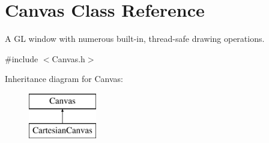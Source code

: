 \hypertarget{class_canvas}{\section{Canvas Class Reference}
\label{class_canvas}
}


A G\+L window with numerous built-\/in, thread-\/safe drawing operations.  




{\ttfamily \#include $<$Canvas.\+h$>$}

Inheritance diagram for Canvas\+:\begin{figure}[H]
\begin{center}
\leavevmode
\includegraphics[height=2.000000cm]{class_canvas}
\end{center}
\end{figure}
